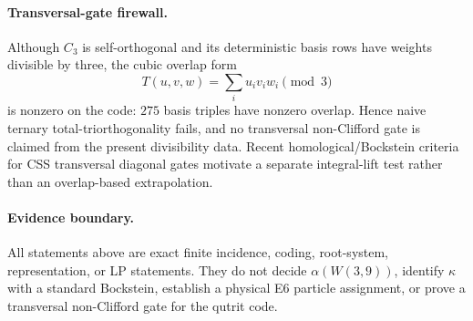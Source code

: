 \paragraph{Transversal-gate firewall.}
Although $C_3$ is self-orthogonal and its deterministic basis rows have weights
divisible by three, the cubic overlap form
\[
 T(u,v,w)=\sum_i u_i v_i w_i\pmod3
\]
is nonzero on the code: $275$ basis triples have nonzero overlap.  Hence naive
ternary total-triorthogonality fails, and no transversal non-Clifford gate is
claimed from the present divisibility data.  Recent homological/Bockstein criteria
for CSS transversal diagonal gates motivate a separate integral-lift test rather
than an overlap-based extrapolation.

\paragraph{Evidence boundary.}
All statements above are exact finite incidence, coding, root-system,
representation, or LP statements.  They do not decide $\alpha(W(3,9))$, identify
$\kappa$ with a standard Bockstein, establish a physical E6 particle assignment,
or prove a transversal non-Clifford gate for the qutrit code.
